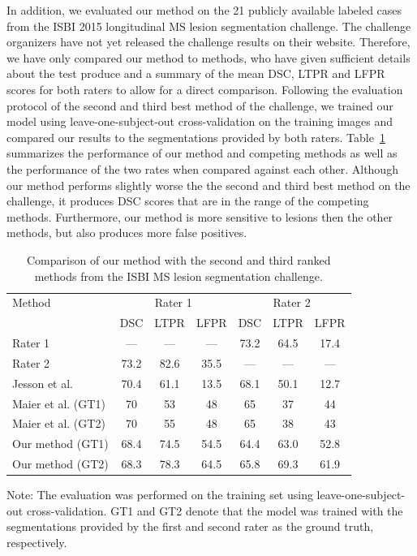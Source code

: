 In addition, we evaluated our method on the 21 publicly available labeled cases
from the ISBI 2015 longitudinal MS lesion segmentation challenge. The challenge
organizers have not yet released the challenge results on their website.
Therefore, we have only compared our method to methods, who have given
sufficient details about the test produce and a summary of the mean DSC, LTPR
and LFPR scores for both raters to allow for a direct comparison.
Following the evaluation protocol of the second and third best method of the
challenge, we trained our model using leave-one-subject-out cross-validation on
the training images and compared our results to the segmentations provided by
both raters. Table~\ref{tab:isbi} summarizes the performance of our method and
competing methods as well as the performance of the two rates when compared
against each other. Although our method performs slightly worse the the second
and third best method on the challenge, it produces DSC scores that are in the
range of the competing methods. Furthermore, our method is more sensitive to
lesions then the other methods, but also produces more false positives.

\begin{table}
\caption{Comparison of our method with the second and third ranked methods from
the ISBI MS lesion segmentation challenge.}
\label{tab:isbi}
\begin{center}
\begin{tabular}{@{}lcccccc@{}}
\toprule
Method &
\multicolumn{3}{c}{Rater 1} &
\multicolumn{3}{c}{Rater 2} \\
& DSC & LTPR & LFPR & DSC & LTPR & LFPR \\
\midrule
Rater 1 & --- & --- & --- & 73.2 & 64.5 & 17.4 \\
Rater 2 & 73.2 & 82.6 & 35.5 & --- & --- & --- \\
Jesson et al. &  70.4 & 61.1 & 13.5 & 68.1 & 50.1 & 12.7 \\
Maier et al. (GT1) & 70 & 53 & 48 & 65 & 37 & 44 \\
Maier et al. (GT2) & 70 & 55 & 48 & 65 & 38 & 43 \\
Our method (GT1) & 68.4 & 74.5 & 54.5 & 64.4 & 63.0 & 52.8 \\
Our method (GT2) & 68.3 & 78.3 & 64.5 & 65.8 & 69.3 & 61.9 \\
\bottomrule
\end{tabular}
\end{center}
Note: The evaluation was performed on the training set using
leave-one-subject-out cross-validation. GT1 and GT2 denote that the model was
trained with the segmentations provided by the first and second rater as the
ground truth, respectively.
\end{table}

